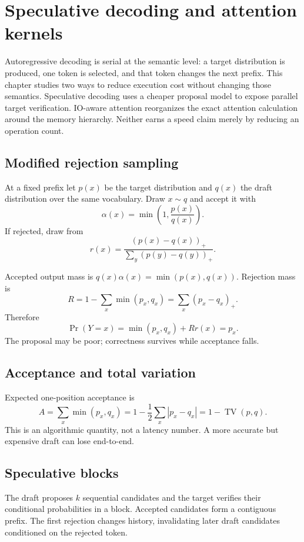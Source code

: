 \chapter{Speculative decoding and attention kernels}

Autoregressive decoding is serial at the semantic level: a target distribution is produced, one token is selected, and that token changes the next prefix. This chapter studies two ways to reduce execution cost without changing those semantics. Speculative decoding uses a cheaper proposal model to expose parallel target verification. IO-aware attention reorganizes the exact attention calculation around the memory hierarchy. Neither earns a speed claim merely by reducing an operation count.

\section{Modified rejection sampling}
At a fixed prefix let $p(x)$ be the target distribution and $q(x)$ the draft distribution over the same vocabulary. Draw $x\sim q$ and accept it with
\[
\alpha(x)=\min\left(1,\frac{p(x)}{q(x)}\right).
\]
If rejected, draw from
\[
r(x)=\frac{(p(x)-q(x))_+}{\sum_y(p(y)-q(y))_+}.
\]

Accepted output mass is $q(x)\alpha(x)=\min(p(x),q(x))$. Rejection mass is
\[
R=1-\sum_x\min(p_x,q_x)=\sum_x(p_x-q_x)_+.
\]
Therefore
\[
\Pr(Y=x)=\min(p_x,q_x)+Rr(x)=p_x.
\]
The proposal may be poor; correctness survives while acceptance falls.

\section{Acceptance and total variation}
Expected one-position acceptance is
\[
A=\sum_x\min(p_x,q_x)=1-\frac12\sum_x|p_x-q_x|=1-\operatorname{TV}(p,q).
\]
This is an algorithmic quantity, not a latency number. A more accurate but expensive draft can lose end-to-end.

\section{Speculative blocks}
The draft proposes $k$ sequential candidates and the target verifies their conditional probabilities in a block.
Accepted candidates form a contiguous prefix. The first rejection changes history, invalidating later draft candidates conditioned on the rejected token.

